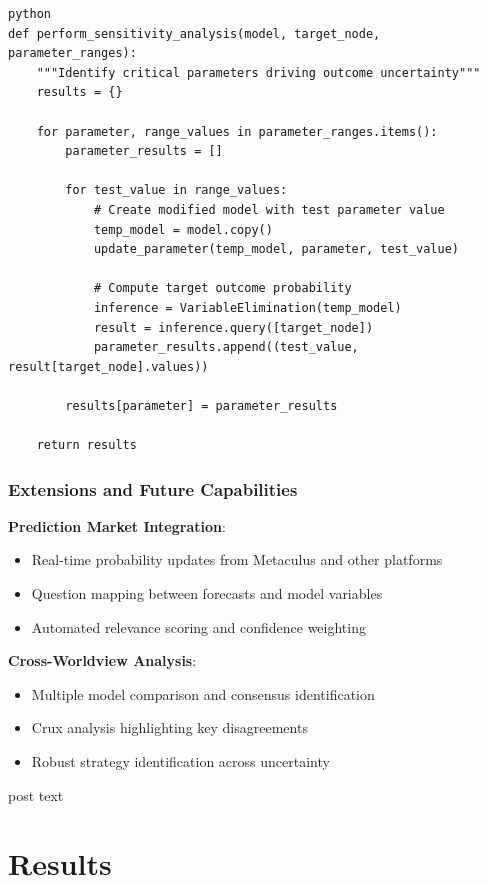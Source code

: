 \documentclass[
  11pt,
  letterpaper,
]{book}
\providecommand{\tightlist}{%
  \setlength{\itemsep}{0pt}\setlength{\parskip}{0pt}}
\begin{document}
\begin{verbatim}
python
def perform_sensitivity_analysis(model, target_node, parameter_ranges):
    """Identify critical parameters driving outcome uncertainty"""
    results = {}
    
    for parameter, range_values in parameter_ranges.items():
        parameter_results = []
        
        for test_value in range_values:
            # Create modified model with test parameter value
            temp_model = model.copy()
            update_parameter(temp_model, parameter, test_value)
            
            # Compute target outcome probability
            inference = VariableElimination(temp_model)
            result = inference.query([target_node])
            parameter_results.append((test_value, result[target_node].values))
            
        results[parameter] = parameter_results
        
    return results
\end{verbatim}

\subsubsection{Extensions and Future Capabilities}\label{sec-extensions}

\textbf{Prediction Market Integration}:

\begin{itemize}
\tightlist
\item
  Real-time probability updates from Metaculus and other platforms
\item
  Question mapping between forecasts and model variables
\item
  Automated relevance scoring and confidence weighting
\end{itemize}

\textbf{Cross-Worldview Analysis}:

\begin{itemize}
\tightlist
\item
  Multiple model comparison and consensus identification
\item
  Crux analysis highlighting key disagreements
\item
  Robust strategy identification across uncertainty
\end{itemize}

post text

\section{Results}\label{sec-results}
\end{document}
